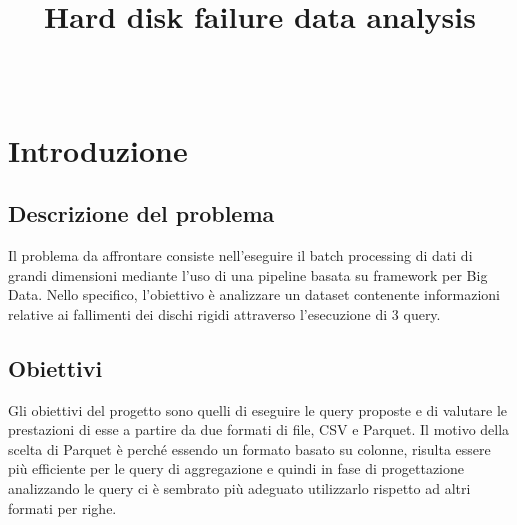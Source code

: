 \documentclass[conference]{IEEEtran}
\begin{document}
\title{Hard disk failure data analysis\\}

\author{
\and
{}
\\
}


\maketitle
\thispagestyle{plain}
\pagestyle{plain}

\begin{abstract}
\end{abstract}

\section{Introduzione}
\subsection{Descrizione del problema}
Il problema da affrontare consiste nell'eseguire il batch processing di dati di grandi dimensioni mediante l'uso di una pipeline basata su framework per Big Data. Nello specifico, l'obiettivo è analizzare un dataset contenente informazioni relative ai fallimenti dei dischi rigidi attraverso l'esecuzione di 3 query.

\subsection{Obiettivi}
Gli obiettivi del progetto sono quelli di eseguire le query proposte e di valutare le prestazioni di esse a partire da due formati di file, CSV e Parquet. Il motivo della scelta di Parquet è perché essendo un formato basato su colonne, risulta essere più efficiente per le query di aggregazione e quindi in fase di progettazione analizzando le query ci è sembrato più adeguato utilizzarlo rispetto ad altri formati per righe.
\end{document}
